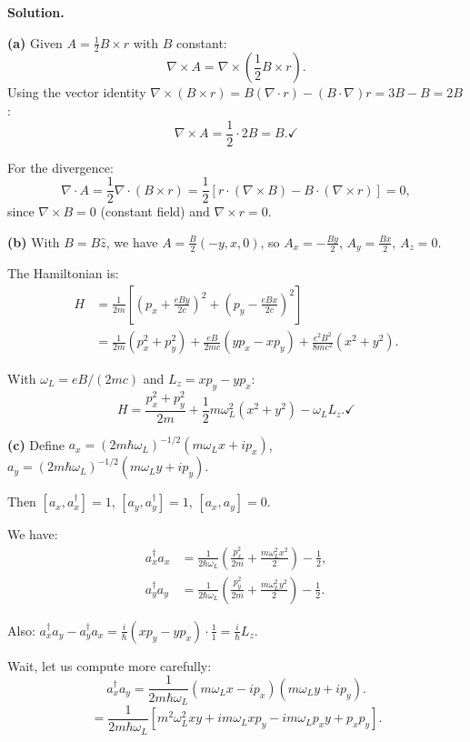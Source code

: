 \documentclass[12pt]{article}
\begin{document}
\bigskip
\textbf{Solution.}

\textbf{(a)} Given $A = \frac{1}{2}B \times r$ with $B$ constant:
\[
\nabla \times A = \nabla \times \left(\frac{1}{2}B \times r\right).
\]
Using the vector identity $\nabla \times (B \times r) = B(\nabla \cdot r) - (B \cdot \nabla)r = 3B - B = 2B$:
\[
\nabla \times A = \frac{1}{2}\cdot 2B = B. \checkmark
\]

For the divergence:
\[
\nabla \cdot A = \frac{1}{2}\nabla \cdot (B \times r) = \frac{1}{2}[r\cdot(\nabla\times B) - B\cdot(\nabla\times r)] = 0,
\]
since $\nabla \times B = 0$ (constant field) and $\nabla \times r = 0$. \checkmark

\bigskip
\textbf{(b)} With $B = B\hat{z}$, we have $A = \frac{B}{2}(-y, x, 0)$, so $A_x = -\frac{By}{2}$, $A_y = \frac{Bx}{2}$, $A_z = 0$.

The Hamiltonian is:
\begin{align*}
H &= \frac{1}{2m}\left[\left(p_x + \frac{eBy}{2c}\right)^2 + \left(p_y - \frac{eBx}{2c}\right)^2\right] \\
&= \frac{1}{2m}(p_x^2 + p_y^2) + \frac{eB}{2mc}(yp_x - xp_y) + \frac{e^2B^2}{8mc^2}(x^2+y^2).
\end{align*}

With $\omega_L = eB/(2mc)$ and $L_z = xp_y - yp_x$:
\[
\boxed{H = \frac{p_x^2+p_y^2}{2m} + \frac{1}{2}m\omega_L^2(x^2+y^2) - \omega_L L_z}. \checkmark
\]

\textbf{(c)} Define $a_x = (2m\hbar\omega_L)^{-1/2}(m\omega_L x + ip_x)$, $a_y = (2m\hbar\omega_L)^{-1/2}(m\omega_L y + ip_y)$.

Then $[a_x, a_x^\dagger] = 1$, $[a_y, a_y^\dagger] = 1$, $[a_x, a_y] = 0$.

We have:
\begin{align*}
a_x^\dagger a_x &= \frac{1}{2\hbar\omega_L}\left(\frac{p_x^2}{2m} + \frac{m\omega_L^2 x^2}{2}\right) - \frac{1}{2}, \\
a_y^\dagger a_y &= \frac{1}{2\hbar\omega_L}\left(\frac{p_y^2}{2m} + \frac{m\omega_L^2 y^2}{2}\right) - \frac{1}{2}.
\end{align*}

Also: $a_x^\dagger a_y - a_y^\dagger a_x = \frac{i}{\hbar}(xp_y - yp_x)\cdot\frac{1}{1} = \frac{i}{\hbar}L_z$.

Wait, let us compute more carefully:
\[
a_x^\dagger a_y = \frac{1}{2m\hbar\omega_L}(m\omega_L x - ip_x)(m\omega_L y + ip_y).
\]
\[
= \frac{1}{2m\hbar\omega_L}[m^2\omega_L^2 xy + im\omega_L xp_y - im\omega_L p_x y + p_x p_y].
\]
\end{document}
